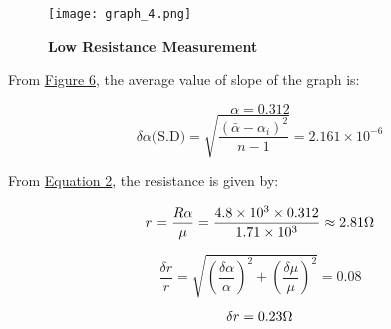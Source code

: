 		\begin{figure}[H]
			\centering
			\texttt{[image: graph\_4.png]}
			\caption{\textbf{Low Resistance Measurement}}
			\label{graph:4}
		\end{figure}

		From \hyperref[graph:4]{Figure 6}, the average value of slope of the graph is:

		$$\alpha = 0.312$$
		$$\delta\alpha \text{(S.D)} = \sqrt{\frac{(\bar{\alpha}-\alpha_i)^2}{n-1}} = 2.161\times10^{-6}$$

		From \hyperref[eqn:2]{Equation 2}, the resistance is given by:

		$$r = \frac{R\alpha}{\mu} 
			= \frac{4.8\times10^3\times0.312}{1.71\times10^3} 
			\approx 2.81 \ohm$$

		$$\frac{\delta r}{r} = \sqrt{
			\left(\frac{\delta\alpha}{\alpha}\right)^2+
			\left(\frac{\delta\mu}{\mu}\right)^2
			} = 0.08$$

		$$\delta r = 0.23\ohm$$